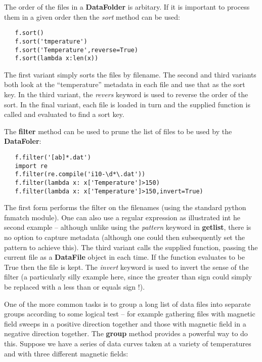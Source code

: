 \documentclass[a4paper,11pt]{scrartcl}
\begin{document}
The order of the files in a \textbf{DataFolder} is arbitary. If it is important to process them in a given order then the \textit{sort} method can be used:

\begin{lstlisting}
   f.sort()
   f.sort('tmperature')
   f.sort('Temperature',reverse=True)
   f.sort(lambda x:len(x))
\end{lstlisting}

The first variant simply sorts the files by filename. The second and third variants both look at the ``temperature'' metadata in each file and use that as the sort key. In the third variant, the \textit{revers} keyword is used to reverse the order of the sort. In the final variant, each file is loaded in turn and the supplied function is called and evaluated to find a sort key.

The \textbf{filter} method can be used to prune the list of files to be used by the \textbf{DataFoler}:

\begin{lstlisting}
   f.filter('[ab]*.dat')
   import re
   f.filter(re.compile('i10-\d*\.dat'))
   f.filter(lambda x: x['Temperature']>150)
   f.filter(lambda x: x['Temperature']>150,invert=True)
\end{lstlisting}

The first form performs the filter on the filenames (using the standard python fnmatch module). One can also use a regular expression as illustrated int he second example -- although unlike using the \textit{pattern} keyword in \textbf{getlist}, there is no option to capture metadata (although one could then subsequently set the pattern to achieve this). The third variant calls the supplied function, passing the current file as a \textbf{DataFile} object in each time. If the function evaluates to be True then the file is kept. The \textit{invert} keyword is used to invert the sense of the filter (a particularly silly example here, since the greater than sign could simply be replaced with a less than or equals sign !).

One of the more common tasks is to group a long list of data files into separate groups according to some logical test --  for example gathering files with magnetic field sweeps in a positive direction together and those with magnetic field in a negative direction together. The \textbf{group} method provides a powerful way to do this. Suppose we have a series of data curves taken at a variety of temperatures and with three different magnetic fields:
\end{document}
